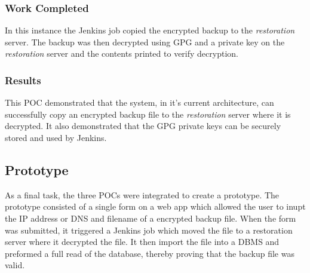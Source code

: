   \subsubsection{Work Completed}
	In this instance the Jenkins job copied the encrypted backup to the \textit{restoration} server. The backup was then decrypted using GPG and a private key on the \textit{restoration} server and the contents printed to verify decryption. 
	
  \subsubsection{Results}
  This POC demonstrated that the system, in it's current architecture, can successfully copy an encrypted backup file to the \textit{restoration} server where it is decrypted. It also demonstrated that the GPG private keys can be securely stored and used by Jenkins.

  \subsection{Prototype}
  As a final task, the three POCs were integrated to create a prototype. The prototype consisted of a single form on a web app which allowed the user to inupt the IP address or DNS and filename of a encrypted backup file. When the form was submitted, it triggered a Jenkins job which moved the file to a restoration server where it decrypted the file. It then import the file into a DBMS and preformed a full read of the database, thereby proving that the backup file was valid.

